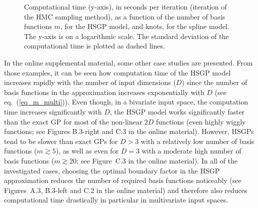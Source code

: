 \documentclass[onecolumn,a4paper,11pt]{article}
\begin{document}
\begin{figure}
\centering
{}
\caption{Computational time (y-axis), in seconds per iteration (iteration of the HMC sampling method), as a function of the number of basis functions $m$, for the HSGP model, and knots, for the spline model. The y-axis is on a logarithmic scale. The standard deviation of the computational time is plotted as dashed lines.}
  \label{ch5_fig11_time_exI}
\end{figure}

In the online supplemental material, some other case studies are presented. From those examples, it can be seen how computation time of the HSGP model increases rapidly with the number of input dimensions ($D$) since the number of basis functions in the approximation increases exponentially with $D$ (see eq.~(\ref{eq_m_multi})). Even though, in a bivariate input space, the computation time increases significantly with $D$, the HSGP model works significantly faster than the exact GP for most of the non-linear $2D$ functions (even highly wiggly functions; see Figures B.3-right and C.3 in the online material). However, HSGPs tend to be slower than exact GPs for $D>3$ with a relatively low number of basis functions ($m \gtrsim 5$), as well as even for $D=3$ with a moderate high number of basis functions ($m \gtrsim 20$; see Figure~C.3 in the online material). In all of the investigated cases, choosing the optimal boundary factor in the HSGP approximation reduces the number of required basis functions noticeably (see Figures~A.3, B.3-left and C.2 in the online material) and therefore also reduces computational time drastically in particular in multivariate input spaces.
\end{document}
